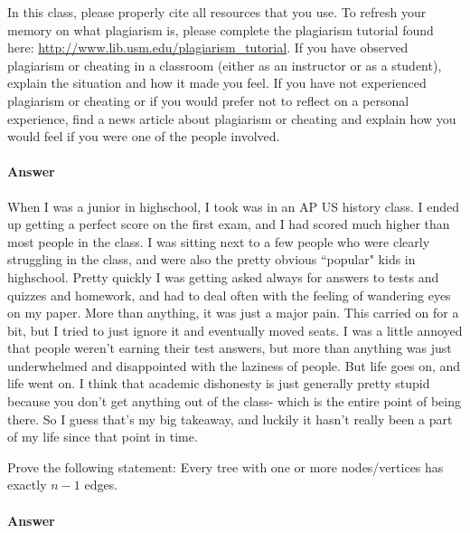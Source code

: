 \documentclass{article}
\begin{document}
\nextprob
\collab{}

    In this class,
    please properly cite all resources that you use.
    To refresh your memory on what plagiarism is,
    please
    complete the plagiarism tutorial found here:
    \url{http://www.lib.usm.edu/plagiarism_tutorial}.
    If you have observed plagiarism or cheating in a classroom (either as an
    instructor or as a student), explain the situation and how it made you
    feel.  If you have not experienced plagiarism or cheating or if you would
    prefer not to reflect on a personal experience, find a news
    article about plagiarism or cheating and explain how you would feel if you
    were one of the people involved.


\paragraph{Answer}


When I was a junior in highschool, I took was in an AP US history class. I ended up 
getting a perfect score on the first exam, and I had scored much higher than most people
in the class. I was sitting next to a few people who were clearly struggling in the class,
and were also the pretty obvious ``popular" kids in highschool. Pretty quickly I was getting 
asked always for answers to tests and quizzes and homework, and had to deal often with the
feeling of wandering eyes on my paper. More than anything, it was just a major pain. This carried
on for a bit, but I tried to just ignore it and eventually moved seats. I was a little annoyed that
people weren't earning their test answers, but more than anything was just underwhelmed and disappointed
with the laziness of people. But life goes on, and life went on. I think that academic dishonesty
is just generally pretty stupid because you don't get anything out of the class- which is the entire
point of being there. So I guess that's my big takeaway, and luckily it hasn't really been a part of my life
since that point in time.




\nextprob
Prove the following statement: Every tree with one or more nodes/vertices has
exactly $n-1$ edges.

\paragraph{Answer}
\end{document}
